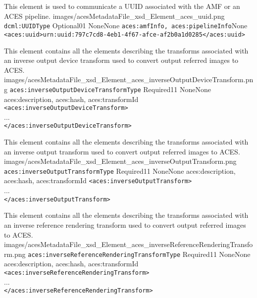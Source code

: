 		{This element is used to communicate a UUID associated with the AMF or an ACES pipeline.}
		{images/acesMetadataFile_xsd_Element_aces_uuid.png}
		{\texttt{dcml:UUIDType}}
		{Optional}{0}{1}
		{None}{None}
		{\texttt{aces:amfInfo, aces:pipelineInfo}}{None}
		{\lstinline{<aces:uuid>urn:uuid:797c7cd8-4eb1-4f67-afce-af2b0a1d0285</aces:uuid>}}

        {This element contains all the elements describing the transforms associated with an inverse output device transform used to convert output referred images to ACES.}
        {images/acesMetadataFile_xsd_Element_aces_inverseOutputDeviceTransform.png}
        {\texttt{aces:inverseOutputDeviceTransformType}}
        {Required}{1}{1}
        {None}{None}
        {aces:description, aces:hash, aces:transformId}
        {\lstinline{<aces:inverseOutputDeviceTransform>} \\
        ... \\
        \lstinline{</aces:inverseOutputDeviceTransform>}}

        {This element contains all the elements describing the transforms associated with an inverse output  transform used to convert output referred images to ACES.}
        {images/acesMetadataFile_xsd_Element_aces_inverseOutputTransform.png}
        {\texttt{aces:inverseOutputTransformType}}
        {Required}{1}{1}
        {None}{None}
        {aces:description, aces:hash, aces:transformId}
        {\lstinline{<aces:inverseOutputTransform>} \\
        ... \\
        \lstinline{</aces:inverseOutputTransform>}}

        {This element contains all the elements describing the transforms associated with an inverse reference rendering transform used to convert output referred images to ACES.}
        {images/acesMetadataFile_xsd_Element_aces_inverseReferenceRenderingTransform.png}
        {\texttt{aces:inverseReferenceRenderingTransformType}}
        {Required}{1}{1}
        {None}{None}
        {aces:description, aces:hash, aces:transformId}
        {\lstinline{<aces:inverseReferenceRenderingTransform>} \\
        ... \\
        \lstinline{</aces:inverseReferenceRenderingTransform>}}

